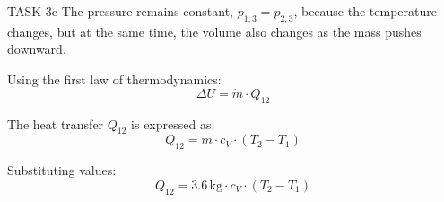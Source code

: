 TASK 3c  
The pressure remains constant, \( p_{1,3} = p_{2,3} \), because the temperature changes, but at the same time, the volume also changes as the mass pushes downward.

Using the first law of thermodynamics:  
\[
\Delta U = \dot{m} \cdot Q_{12}
\]

The heat transfer \( Q_{12} \) is expressed as:  
\[
Q_{12} = m \cdot c_V \cdot (T_2 - T_1)
\]

Substituting values:  
\[
Q_{12} = 3.6 \, \text{kg} \cdot c_V \cdot (T_2 - T_1)
\]